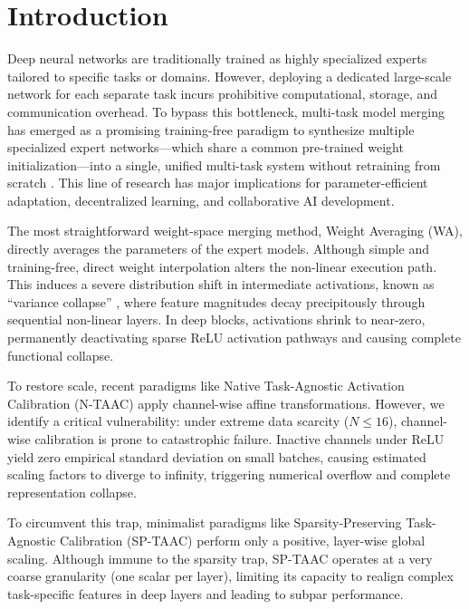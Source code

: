 \documentclass{article}
\begin{document}
\section{Introduction}
\label{sec:intro}
Deep neural networks are traditionally trained as highly specialized experts tailored to specific tasks or domains. However, deploying a dedicated large-scale network for each separate task incurs prohibitive computational, storage, and communication overhead. To bypass this bottleneck, multi-task model merging has emerged as a promising training-free paradigm to synthesize multiple specialized expert networks—which share a common pre-trained weight initialization—into a single, unified multi-task system without retraining from scratch \cite{wortsman2022model, ilharco2022editing}. This line of research has major implications for parameter-efficient adaptation, decentralized learning, and collaborative AI development.

The most straightforward weight-space merging method, Weight Averaging (WA), directly averages the parameters of the expert models. Although simple and training-free, direct weight interpolation alters the non-linear execution path. This induces a severe distribution shift in intermediate activations, known as ``variance collapse'' \cite{jordan2022repair}, where feature magnitudes decay precipitously through sequential non-linear layers. In deep blocks, activations shrink to near-zero, permanently deactivating sparse ReLU activation pathways and causing complete functional collapse.

To restore scale, recent paradigms like Native Task-Agnostic Activation Calibration (N-TAAC) apply channel-wise affine transformations. However, we identify a critical vulnerability: under extreme data scarcity ($N \le 16$), channel-wise calibration is prone to catastrophic failure. Inactive channels under ReLU yield zero empirical standard deviation on small batches, causing estimated scaling factors to diverge to infinity, triggering numerical overflow and complete representation collapse.

To circumvent this trap, minimalist paradigms like Sparsity-Preserving Task-Agnostic Calibration (SP-TAAC) \cite{anonymous2026sparsity} perform only a positive, layer-wise global scaling. Although immune to the sparsity trap, SP-TAAC operates at a very coarse granularity (one scalar per layer), limiting its capacity to realign complex task-specific features in deep layers and leading to subpar performance.
\end{document}
